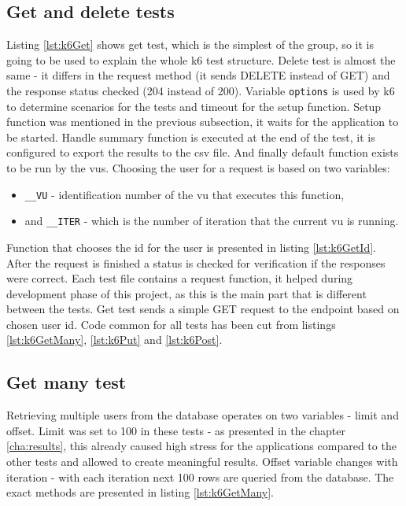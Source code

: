 \subsection{Get and delete tests}
Listing \ref{lst:k6Get} shows get test, which is the simplest of the group, so it is going to be used to explain the whole k6 test structure.
Delete test is almost the same - it differs in the request method (it sends DELETE instead of GET) and the response status checked (204 instead of 200).
Variable \lstinline{options} is used by k6 to determine scenarios for the tests and timeout for the setup function.
Setup function was mentioned in the previous subsection, it waits for the application to be started.
Handle summary function is executed at the end of the test, it is configured to export the results to the \acrshort{csv} file.
And finally default function exists to be run by the \acrshort{vu}s. Choosing the user for a request is based on two variables:
\begin{itemize}
    \item \lstinline{__VU} - identification number of the \acrshort{vu} that executes this function,
    \item and \lstinline{__ITER} - which is the number of iteration that the current \acrshort{vu} is running.
\end{itemize}
Function that chooses the id for the user is presented in listing \ref{lst:k6GetId}.
After the request is finished a status is checked for verification if the responses were correct.
Each test file contains a request function, it helped during development phase of this project, as this is the main part that is different between the tests.
Get test sends a simple GET request to the endpoint based on chosen user id.
Code common for all tests has been cut from listings \ref{lst:k6GetMany}, \ref{lst:k6Put} and \ref{lst:k6Post}.



\subsection{Get many test}
Retrieving multiple users from the database operates on two variables - limit and offset. Limit was set to 100 in these tests - as presented in the chapter \ref{cha:results}, this already caused high stress for the applications compared to the other tests and allowed to create meaningful results. Offset variable changes with iteration - with each iteration next 100 rows are queried from the database. The exact methods are presented in listing \ref{lst:k6GetMany}.


